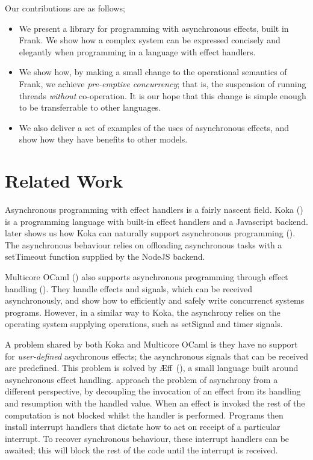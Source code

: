 \documentclass[msc,deptreport,cs]{infthesis} %
\newcommand\aeff{{\AE}ff\xspace}
\newcommand{\todo}[1]
           {{\par\noindent\small\color{RoyalPurple}
  \framebox{\parbox{\dimexpr\linewidth-2\fboxsep-2\fboxrule}
    {\textbf{TODO:} #1}}}}
\begin{document}
Our contributions are as follows;

\begin{itemize}
\item We present a library for programming with asynchronous effects, built in
  Frank. We show how a complex system can be expressed concisely and elegantly
  when programming in a language with effect handlers.

\item We show how, by making a small change to the operational semantics of
  Frank, we achieve \emph{pre-emptive concurrency}; that is, the suspension of
  running threads \emph{without} co-operation. It is our hope that this change
  is simple enough to be transferrable to other languages.

\item We also deliver a set of examples of the uses of asynchronous effects, and
  show how they have benefits to other models.
\end{itemize}

\section{Related Work}

Asynchronous programming with effect handlers is a fairly nascent field.
%
Koka (\cite{leijen2014koka}) is a programming language with built-in effect
handlers and a Javascript backend. \citeauthor{leijen2017structured} later shows
us how Koka can naturally support asynchronous programming
(\cite{leijen2017structured}). The asynchronous behaviour relies on offloading
asynchronous tasks with a \textsf{setTimeout} function supplied by the NodeJS
backend.

Multicore OCaml (\cite{dolan2014multicore}) also supports asynchronous
programming through effect handling (\cite{dolan2017concurrent}). They handle
effects and signals, which can be received asynchronously, and show how to
efficiently and safely write concurrenct systems programs. However, in a similar
way to Koka, the asynchrony relies on the operating system supplying operations,
such as \textsf{setSignal} and \textsf{timer} signals.

A problem shared by both Koka and Multicore OCaml is they have no support for
\emph{user-defined} asychronous effects; the asynchronous signals that can be
received are predefined. This problem is solved by
\aeff~(\cite{ahman2020asynchronous}), a small language built around asynchronous
effect handling. \citeauthor{ahman2020asynchronous} approach the problem of
asynchrony from a different perspective, by decoupling the invocation of an
effect from its handling and resumption with the handled value. When an effect
is invoked the rest of the computation is not blocked whilst the handler is
performed. Programs then install interrupt handlers that dictate how to act on
receipt of a particular interrupt. To recover synchronous behaviour, these
interrupt handlers can be \textsf{await}ed; this will block the rest of the code
until the interrupt is received.
\end{document}

